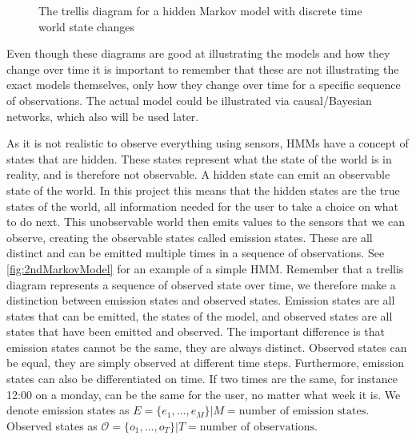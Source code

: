\begin{figure}[htbp]
\centering
{}
\caption[Trellis diagram for a simple Markov model]{The trellis diagram for a hidden Markov model with discrete time world state changes}\label{fig:1stMarkovModel}
\end{figure}

Even though these diagrams are good at illustrating the models and how they change over time it is important to remember that these are not illustrating the exact models themselves, only how they change over time for a specific sequence of observations. The actual model could be illustrated via causal/Bayesian networks, which also will be used later.


As it is not realistic to observe everything using sensors, HMMs have a concept of states that are hidden. These states represent what the state of the world is in reality, and is therefore not observable. A hidden state can emit an observable state of the world. In this project this means that the hidden states are the true states of the world, all information needed for the user to take a choice on what to do next. This unobservable world then emits values to the sensors that we can observe, creating the observable states called emission states. These are all distinct and can be emitted multiple times in a sequence of observations. See \cref{fig:2ndMarkovModel} for an example of a simple HMM. Remember that a trellis diagram represents a sequence of observed state over time, we therefore make a distinction between emission states and observed states. Emission states are all states that can be emitted, the states of the model, and observed states are all states that have been emitted and observed. The important difference is that emission states cannot be the same, they are always distinct. Observed states can be equal, they are simply observed at different time steps. Furthermore, emission states can also be differentiated on time. If two times are the same, for instance 12:00 on a monday, can be the same for the user, no matter what week it is. We denote emission states as $E=\{e_1, \dots ,e_{M}\}|M = \text{number of emission states}$. Observed states as $\mathcal{O}=\{o_1, \dots , o_T\}|T = \text{number of observations}$.

